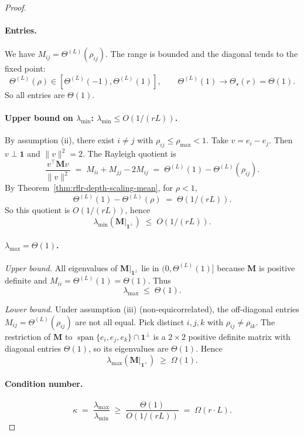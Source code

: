 \begin{proof}
\paragraph{Entries.}
We have \(M_{ij}=\Theta^{(L)}(\rho_{ij})\). The range is bounded and the diagonal tends to the fixed point:
\[
\Theta^{(L)}(\rho)\in[\Theta^{(L)}(-1),\Theta^{(L)}(1)], \qquad \Theta^{(L)}(1)\to\Theta_\star(r)=\Theta(1).
\]
So all entries are \(\Theta(1)\).

\paragraph{Upper bound on \(\lambda_{\min}\): \(\lambda_{\min}\le O(1/(rL))\).}
By assumption (ii), there exist \(i\neq j\) with \(\rho_{ij}\le\rho_{\max}<1\). Take \(v=e_i-e_j\). Then \(v\perp\mathbf{1}\) and \(\|v\|^2=2\). The Rayleigh quotient is
\[
\frac{v^\top \mathbf{M} v}{\|v\|^2} \;=\; M_{ii}+M_{jj}-2M_{ij} \;=\; \Theta^{(L)}(1)-\Theta^{(L)}(\rho_{ij}).
\]
By Theorem~\ref{thm:rflr-depth-scaling-mean}, for \(\rho<1\),
\[
\Theta^{(L)}(1)-\Theta^{(L)}(\rho)\;=\;\Theta(1/(rL)).
\]
So this quotient is \(O(1/(rL))\), hence
\[
\lambda_{\min}(\mathbf{M}|_{\mathbf{1}^\perp})\;\le\; O(1/(rL)).
\]

\paragraph{\(\lambda_{\max}=\Theta(1)\).}
\emph{Upper bound.} All eigenvalues of \(\mathbf{M}|_{\mathbf{1}^\perp}\) lie in \((0,\Theta^{(L)}(1)]\) because \(\mathbf{M}\) is positive definite and \(M_{ii}=\Theta^{(L)}(1)=\Theta(1)\). Thus
\[
\lambda_{\max}\;\le\; \Theta(1).
\]

\medskip\noindent
\emph{Lower bound.} Under assumption (iii) (non-equicorrelated), the off-diagonal entries \(M_{ij}=\Theta^{(L)}(\rho_{ij})\) are not all equal. Pick distinct \(i,j,k\) with \(\rho_{ij}\neq\rho_{ik}\). The restriction of \(\mathbf{M}\) to \(\operatorname{span}\{e_i,e_j,e_k\}\cap\mathbf{1}^\perp\) is a \(2\times 2\) positive definite matrix with diagonal entries \(\Theta(1)\), so its eigenvalues are \(\Theta(1)\). Hence
\[
\lambda_{\max}(\mathbf{M}|_{\mathbf{1}^\perp})\;\ge\; \Omega(1).
\]

\paragraph{Condition number.}
\[
\kappa \;=\; \frac{\lambda_{\max}}{\lambda_{\min}} \;\ge\; \frac{\Theta(1)}{O(1/(rL))} \;=\; \Omega(r\cdot L).
\]
\end{proof}

